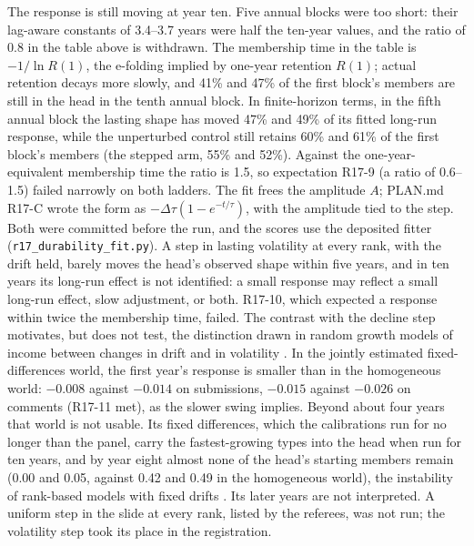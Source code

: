\documentclass[10pt]{article}
\begin{document}
The response is still moving at year ten. Five annual blocks were too short: their lag-aware constants of 3.4--3.7 years were half the ten-year values, and the ratio of 0.8 in the table above is withdrawn. The membership time in the table is $-1/\ln R(1)$, the e-folding implied by one-year retention $R(1)$; actual retention decays more slowly, and 41\% and 47\% of the first block's members are still in the head in the tenth annual block. In finite-horizon terms, in the fifth annual block the lasting shape has moved 47\% and 49\% of its fitted long-run response, while the unperturbed control still retains 60\% and 61\% of the first block's members (the stepped arm, 55\% and 52\%). Against the one-year-equivalent membership time the ratio is 1.5, so expectation R17-9 (a ratio of 0.6--1.5) failed narrowly on both ladders. The fit frees the amplitude $A$; PLAN.md R17-C wrote the form as $-\Delta\tau(1-e^{-t/\tau})$, with the amplitude tied to the step. Both were committed before the run, and the scores use the deposited fitter (\texttt{r17\_durability\_fit.py}). A step in lasting volatility at every rank, with the drift held, barely moves the head's observed shape within five years, and in ten years its long-run effect is not identified: a small response may reflect a small long-run effect, slow adjustment, or both. R17-10, which expected a response within twice the membership time, failed. The contrast with the decline step motivates, but does not test, the distinction drawn in random growth models of income between changes in drift and in volatility \cite{gllm2016}. In the jointly estimated fixed-differences world, the first year's response is smaller than in the homogeneous world: $-0.008$ against $-0.014$ on submissions, $-0.015$ against $-0.026$ on comments (R17-11 met), as the slower swing implies. Beyond about four years that world is not usable. Its fixed differences, which the calibrations run for no longer than the panel, carry the fastest-growing types into the head when run for ten years, and by year eight almost none of the head's starting members remain (0.00 and 0.05, against 0.42 and 0.49 in the homogeneous world), the instability of rank-based models with fixed drifts \cite{fik2013}. Its later years are not interpreted. A uniform step in the slide at every rank, listed by the referees, was not run; the volatility step took its place in the registration.
\end{document}
